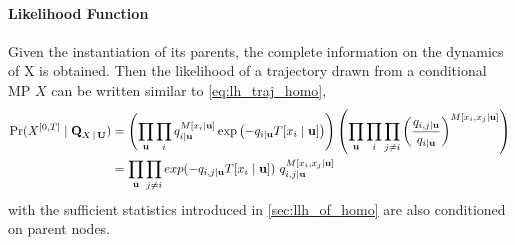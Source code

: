\paragraph*{Likelihood Function}
Given the instantiation of its parents, the complete information on the dynamics of X is obtained. Then the likelihood of a trajectory drawn from a conditional MP $ X $ can be written similar to \autoref{eq:lh_traj_homo},
\begin{align}
\operatorname{Pr}(X^{[0,T]}  \mid \textbf{Q}_{X\,|\, \textbf{U}}) &=  \left(\prod_{ \textbf{u}}\prod_{ i} q_{i\mid \textbf{u}}^{M[x_{i}\mid \textbf{u}]} \exp \left(-q_{i\mid \textbf{u}} T[x_{i}\mid \textbf{u}]\right)\right)\left(\prod_{ \textbf{u}}\prod_{ i} \prod_{ j \neq i} \left(\frac{q_{i,j\mid \textbf{u}}}{q_{i\mid \textbf{u}}}\right)^{M\left[x_{i}, x_{j}\mid \textbf{u}\right]}\right) \nonumber\\ & = \prod_{ \textbf{u}}\prod_{j\neq i}  exp(-q_{i,j\mid \textbf{u}}T[x_{i}\mid \textbf{u}]) \ q_{i,j\mid \textbf{u}}^{M[x_{i},x_{j}\mid \textbf{u}]}
\label{eq:lh_traj_cond}
\end{align}
with the sufficient statistics introduced in \cref{sec:llh_of_homo} are also conditioned on parent nodes.



